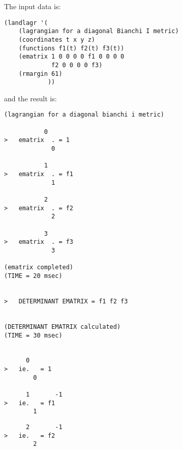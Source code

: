 The input data is:

\bigskip

\begin{verbatim}
(landlagr '(
    (lagrangian for a diagonal Bianchi I metric)
    (coordinates t x y z)
    (functions f1(t) f2(t) f3(t))
    (ematrix 1 0 0 0 0 f1 0 0 0 0
             f2 0 0 0 0 f3)
    (rmargin 61)
            ))
\end{verbatim}

\bigskip

\noindent and the result is:

\bigskip

\begin{verbatim}
(lagrangian for a diagonal bianchi i metric)

           0
>   ematrix  . = 1
             0

           1
>   ematrix  . = f1
             1

           2
>   ematrix  . = f2
             2

           3
>   ematrix  . = f3
             3

(ematrix completed)
(TIME = 20 msec)


>   DETERMINANT EMATRIX = f1 f2 f3


(DETERMINANT EMATRIX calculated)
(TIME = 30 msec)


      0
>   ie.   = 1
        0

      1       -1
>   ie.   = f1
        1

\end{verbatim}
{\samepage
\begin{verbatim}
      2       -1
>   ie.   = f2
        2
\end{verbatim}
      }
